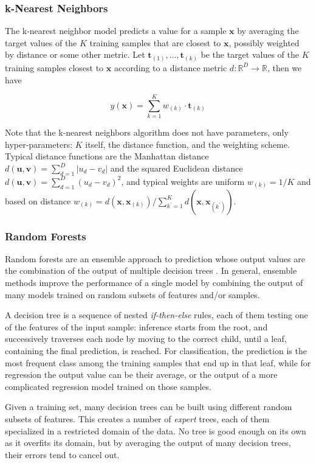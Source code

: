 \documentclass[12pt]{book}
\begin{document}
\subsubsection{k-Nearest Neighbors}
The k-nearest neighbor model \cite{knn} predicts a value for a sample $\bm x$ by averaging the target values of the $K$ training samples that are closest to $\bm x$, possibly weighted by distance or some other metric. Let $\bm t_{(1)},\ldots,\bm t_{(k)}$ be the target values of the $K$ training samples closest to $\bm x$ according to a distance metric $d:\mathbb{R}^D\rightarrow\mathbb{R}$, then we have

\begin{equation}
y(\bm x)=\sum_{k=1}^K w_{(k)}\cdot\bm t_{(k)}
\end{equation}


Note that the k-nearest neighbors algorithm does not have parameters, only hyper\hyp{}parameters: $K$ itself, the distance function, and the weighting scheme. Typical distance functions are the Manhattan distance $d(\bm u,\bm v)=\sum_{d=1}^D\vert u_d-v_d\vert$ and the squared Euclidean distance $d(\bm u,\bm v)=\sum_{d=1}^D(u_d-v_d)^2$, and typical weights are uniform $w_{(k)}=1/K$ and based on distance $w_{(k)}=d(\bm x,\bm x_{(k)})/\sum_{k^\prime=1}^K d(\bm x,\bm x_{(k^\prime)})$.

\subsubsection{Random Forests}
Random forests are an ensemble approach to prediction whose output values are the combination of the output of multiple decision trees \cite{random_forests}. In general, ensemble methods improve the performance of a single model by combining the output of many models trained on random subsets of features and/or samples.

A decision tree is a sequence of nested \emph{if-then-else} rules, each of them testing one of the features of the input sample: inference starts from the root, and successively traverses each node by moving to the correct child, until a leaf, containing the final prediction, is reached. For classification, the prediction is the most frequent class among the training samples that end up in that leaf, while for regression the output value can be their average, or the output of a more complicated regression model trained on those samples.

Given a training set, many decision trees can be built using different random subsets of features. This creates a number of \emph{expert} trees, each of them specialized in a restricted domain of the data. No tree is good enough on its own as it overfits its domain, but by averaging the output of many decision trees, their errors tend to cancel out.
\end{document}
